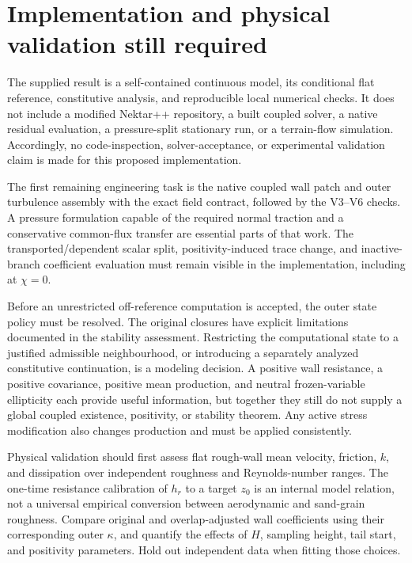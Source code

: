 \documentclass[11pt,a4paper]{article}
\numberwithin{equation}{section}
\begin{document}
\section{Implementation and physical validation still required}
\label{num:remaining}

The supplied result is a self-contained continuous model, its
conditional flat reference, constitutive analysis, and reproducible
local numerical checks.  It does not include a modified Nektar++
repository, a built coupled solver, a native residual evaluation,
a pressure-split stationary run, or a terrain-flow simulation.
Accordingly, no code-inspection, solver-acceptance, or experimental
validation claim is made for this proposed implementation.

The first remaining engineering task is the native coupled wall
patch and outer turbulence assembly with the exact field contract,
followed by the V3--V6 checks.  A pressure formulation capable of
the required normal traction and a conservative common-flux transfer
are essential parts of that work.  The transported/dependent scalar
split, positivity-induced trace change, and inactive-branch
coefficient evaluation must remain visible in the implementation,
including at $\chi=0$.

Before an unrestricted off-reference computation is accepted, the
outer state policy must be resolved.  The original closures have
explicit limitations documented in the stability assessment.
Restricting the computational state to a justified admissible
neighbourhood, or introducing a separately analyzed constitutive
continuation, is a modeling decision.  A positive wall resistance,
a positive covariance, positive mean production, and neutral
frozen-variable ellipticity each provide useful information, but
together they still do not supply a global coupled existence,
positivity, or stability theorem.  Any active stress modification
also changes production and must be applied consistently.

Physical validation should first assess flat rough-wall mean
velocity, friction, $k$, and dissipation over independent roughness
and Reynolds-number ranges.  The one-time resistance calibration
of $h_r$ to a target $z_0$ is an internal model relation, not a
universal empirical conversion between aerodynamic and sand-grain
roughness.  Compare original and overlap-adjusted wall coefficients
using their corresponding outer $\kappa$, and quantify the effects
of $H$, sampling height, tail start, and positivity parameters.
Hold out independent data when fitting those choices.
\end{document}
